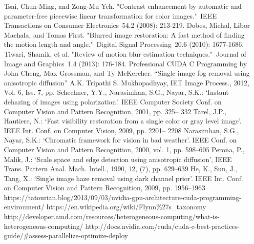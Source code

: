 \begin{thebibliography}{9}
Tsai, Chun-Ming, and Zong-Mu Yeh. "Contrast enhancement by automatic and parameter-free piecewise linear transformation for color images." IEEE Transactions on Consumer Electronics 54.2 (2008): 213-219.  
Dobes, Michal, Libor Machala, and Tomas First. "Blurred image restoration: A fast method of finding the motion length and angle." Digital Signal Processing 20.6 (2010): 1677-1686.
 Tiwari, Shamik, et al. "Review of motion blur estimation techniques." Journal of Image and Graphics 1.4 (2013): 176-184.
Professional CUDA C Programming by John Cheng, Max Grossman, and Ty McKercher.
“Single image fog removal using anisotropic diffusion” A.K. Tripathi S. Mukhopadhyay, IET Image Process., 2012, Vol. 6, Iss. 7, pp.
Schechner, Y.Y., Narasimhan, S.G., Nayar, S.K.: ‘Instant dehazing of images using polarization’. IEEE Computer Society Conf. on Computer Vision and Pattern Recognition, 2001, pp. 325– 332
Tarel, J.P., Hautiere, N.: ‘Fast visibility restoration from a single color or gray level image’. IEEE Int. Conf. on Computer Vision, 2009, pp. 2201– 2208
 Narasimhan, S.G., Nayar, S.K.: ‘Chromatic framework for vision in bad weather’. IEEE Conf. on Computer Vision and Pattern Recognition, 2000, vol. 1, pp. 598–605
 Perona, P., Malik, J.: ‘Scale space and edge detection using anisotropic diffusion’, IEEE Trans. Pattern Anal. Mach. Intell., 1990, 12, (7), pp. 629–639
 He, K., Sun, J., Tang, X.: ‘Single image haze removal using dark channel prior’. IEEE Int. Conf. on Computer Vision and Pattern
Recognition, 2009, pp. 1956–1963
https://tatourian.blog/2013/09/03/nvidia-gpu-architecture-cuda-programming-environment/
https://en.wikipedia.org/wiki/Flynn\%27s\_taxonomy
http://developer.amd.com/resources/heterogeneous-computing/what-is-heterogeneous-computing/
http://docs.nvidia.com/cuda/cuda-c-best-practices-guide/\#assess-parallelize-optimize-deploy
\end{thebibliography}